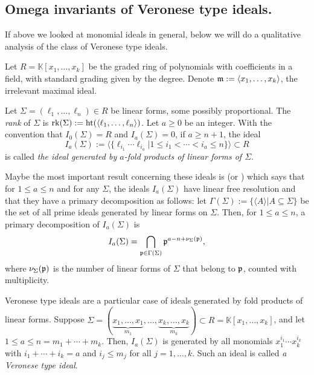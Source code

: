 \documentclass[11pt]{amsart}   %
\begin{document}
\subsection{Omega invariants of Veronese type ideals.}\label{sec_Veronese} If above we looked at monomial ideals in general, below we will do a qualitative analysis of the class of Veronese type ideals.

Let $R=\mathbb K[x_1,\ldots,x_k]$ be the graded ring of polynomials with coefficients in a field, with standard grading given by the degree. Denote $\frak m:=\langle x_1,\ldots,x_k\rangle$, the irrelevant maximal ideal. 

Let $\Sigma=(\ell_1,\ldots,\ell_n)\in R$ be linear forms, some possibly proportional. The {\em rank} of $\Sigma$ is ${\rm rk}(\Sigma):={\rm ht}(\langle \ell_1,\ldots,\ell_n\rangle)$. Let $a\geq 0$ be an integer. With the convention that $I_0(\Sigma)=R$ and $I_a(\Sigma)=0$, if $a\geq n+1$, the ideal $$I_a(\Sigma):=\langle\{\ell_{i_1}\cdots\ell_{i_a}|1\leq i_1<\cdots<i_a\leq n\}\rangle\subset R$$ is called {\em the ideal generated by $a$-fold products of linear forms of $\Sigma$}.

Maybe the most important result concerning these ideals is \cite[Theorem 2.2]{BuToXi} (or \cite[Theorem 3.35]{To}) which says that for $1\leq a\leq n$ and for any $\Sigma$, the ideals $I_a(\Sigma)$ have linear free resolution and that they have a primary decomposition as follows: let $\Gamma(\Sigma):=\{\langle A \rangle | A\subseteq\Sigma\}$ be the set of all prime ideals generated by linear forms on $\Sigma$. Then, for $1\leq a\leq n$, a primary decomposition of $I_a(\Sigma)$ is
$$I_a(\Sigma)=\bigcap_{\frak p\in\Gamma(\Sigma)}\frak p^{a-n+\nu_{\Sigma}(\frak p)},$$ where $\nu_{\Sigma}(\frak p)$ is the number of linear forms of $\Sigma$ that belong to $\frak p$, counted with multiplicity.

\medskip

Veronese type ideals are a particular case of ideals generated by fold products of linear forms. Suppose $\Sigma=(\underbrace{x_1,\ldots,x_1}_{m_1},\ldots,\underbrace{x_k,\ldots,x_k}_{m_k})\subset R=\mathbb K[x_1,\ldots,x_k]$, and let $1\leq a\leq n=m_1+\cdots+m_k$. Then, $I_a(\Sigma)$ is generated by all monomials $x_1^{i_1}\cdots x_k^{i_k}$ with $i_1+\cdots+i_k=a$ and $i_j\leq m_j$ for all $j=1,\ldots,k$. Such an ideal is called {\em a Veronese type ideal}.
\end{document}
